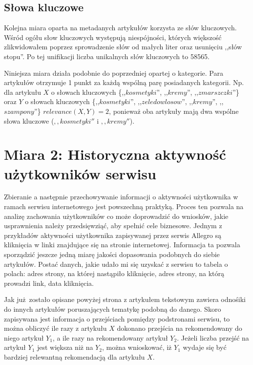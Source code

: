 \documentclass[pl]{minipw} %
\begin{document}
\subsection{Słowa kluczowe}

Kolejna miara oparta na metadanych artykułów korzysta ze słów kluczowych. Wśród ogółu słow kluczowych występują niespójności, których większość zlikwidowałem poprzez sprowadzenie słów od małych liter oraz usunięciu ,,słów stopu''. Po tej unifikacji liczba unikalnych słów kluczowych to 58565.

Niniejsza miara działa podobnie do poprzedniej opartej o kategorie. Para artykułów otrzymuje 1 punkt za każdą wspólną parę posiadanych kategorii. Np. dla artykułu $X$ o słowach kluczowych \{,,$kosmetyki$'', ,,$kremy$'', ,,$zmarszczki$''\} oraz $Y$ o słowach kluczowych \{,,$kosmetyki$'', ,,$zele do wlosow$'', ,,$kremy$'', ,,$szampony$''\} $relevance(X,Y)=2$, ponieważ oba artykuły mają dwa wspólne słowa kluczowe ($,,kosmetyki''$ i $,,kremy''$).

\section{Miara 2: Historyczna aktywność użytkowników serwisu}

Zbieranie a następnie przechowywanie informacji o aktywności użytkownika w ramach serwisu internetowego jest powszechną praktyką. Proces ten pozwala na analizę zachowania użytkowników co może doprowadzić do wniosków, jakie usprawnienia należy przedsięwziąć, aby spełnić cele biznesowe. Jednym z przykładów aktywności użytkownika zapisywanej przez serwis Allegro są kliknięcia w linki znajdujące się na stronie internetowej. Informacja ta pozwala sporządzić jeszcze jedną miarę jakości dopasowania podobnych do siebie artykułów. Postać danych, jakie udało mi się uzyskać z serwisu to tabela o polach: adres strony, na której nastąpiło kliknięcie, adres strony, na którą prowadzi link, data kliknięcia.

Jak już zostało opisane powyżej strona z artykułem tekstowym zawiera odnośiki do innych artykułów poruszających tematykę podobną do danego. Skoro zapisywana jest informacja o przejściach pomiędzy podstronami serwisu, to można obliczyć ile razy z artykułu $X$ dokonano przejścia na rekomendowany do niego artykuł $Y_1$, a ile razy na rekomendowany artykuł $Y_2$. Jeżeli liczba przejść na artykuł $Y_1$ jest większa niż na $Y_2$, można wnioskować, iż $Y_1$ wydaje się być bardziej relewantną rekomendacją dla artykułu $X$.
\end{document}
